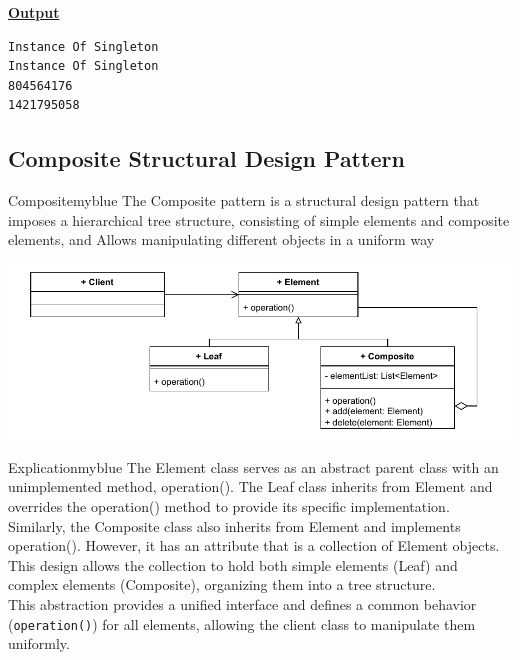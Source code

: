 \vspace{1cm}

\textbf{\underline{Output}}
\vspace{0.1cm}
\begin{lstlisting}[style=cmd]
Instance Of Singleton
Instance Of Singleton
804564176
1421795058
\end{lstlisting}





\newpage
\subsection{Composite Structural Design Pattern}
\begin{prettyBox}{Composite}{myblue}
The Composite pattern is a structural design pattern that imposes a
hierarchical tree structure, consisting of simple elements and composite elements, and 
Allows manipulating different objects in a uniform way
\end{prettyBox}

\vspace{1cm}


\begin{center}
\includegraphics[height=0.3\textheight]{Chapters/DesignPattern/Composite/comp1.drawio.pdf}
\end{center}

\vspace{1cm}

\begin{prettyBox}{Explication}{myblue}
The Element class serves as an abstract parent class with an unimplemented method, operation().  
The Leaf class inherits from Element and overrides the operation() method to provide its specific implementation.  
Similarly, the Composite class also inherits from Element and implements operation(). However, it has an attribute that is a collection of Element objects.  
This design allows the collection to hold both simple elements (Leaf) and complex elements (Composite), organizing them into a tree structure.\\[0.1cm]
This abstraction provides a unified interface and defines a common behavior (\texttt{operation()}) 
for all elements, allowing the client class to manipulate them uniformly.
\end{prettyBox}

